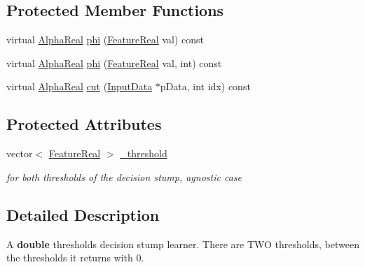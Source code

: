 \subsection*{Protected Member Functions}
\begin{DoxyCompactItemize}
\item 
virtual \hyperlink{Defaults_8h_a80184c4fd10ab70a1a17c5f97dcd1563}{AlphaReal} \hyperlink{classMultiBoost_1_1SingleSparseStump_a8e37f68aa30c13e494b639693ae55b3d}{phi} (\hyperlink{Defaults_8h_a3a11cfe6a5d469d921716ca6291e934f}{FeatureReal} val) const 
\item 
virtual \hyperlink{Defaults_8h_a80184c4fd10ab70a1a17c5f97dcd1563}{AlphaReal} \hyperlink{classMultiBoost_1_1SingleSparseStump_ad16a2557090c526ad36306a3704f92ec}{phi} (\hyperlink{Defaults_8h_a3a11cfe6a5d469d921716ca6291e934f}{FeatureReal} val, int) const 
\item 
virtual \hyperlink{Defaults_8h_a80184c4fd10ab70a1a17c5f97dcd1563}{AlphaReal} \hyperlink{classMultiBoost_1_1SingleSparseStump_a959f78588455daafd0fce520953bdcb4}{cut} (\hyperlink{classMultiBoost_1_1InputData}{InputData} $\ast$pData, int idx) const 
\end{DoxyCompactItemize}
\subsection*{Protected Attributes}
\begin{DoxyCompactItemize}
\item 
\hypertarget{classMultiBoost_1_1SingleSparseStump_a96e5594a012cf779451539eb5a313292}{
vector$<$ \hyperlink{Defaults_8h_a3a11cfe6a5d469d921716ca6291e934f}{FeatureReal} $>$ \hyperlink{classMultiBoost_1_1SingleSparseStump_a96e5594a012cf779451539eb5a313292}{\_\-threshold}}
\label{classMultiBoost_1_1SingleSparseStump_a96e5594a012cf779451539eb5a313292}

\begin{DoxyCompactList}\small\item\em for both thresholds of the decision stump, agnostic case \end{DoxyCompactList}\end{DoxyCompactItemize}


\subsection{Detailed Description}
A {\bfseries double} thresholds decision stump learner. There are TWO thresholds, between the thresholds it returns with 0. 

